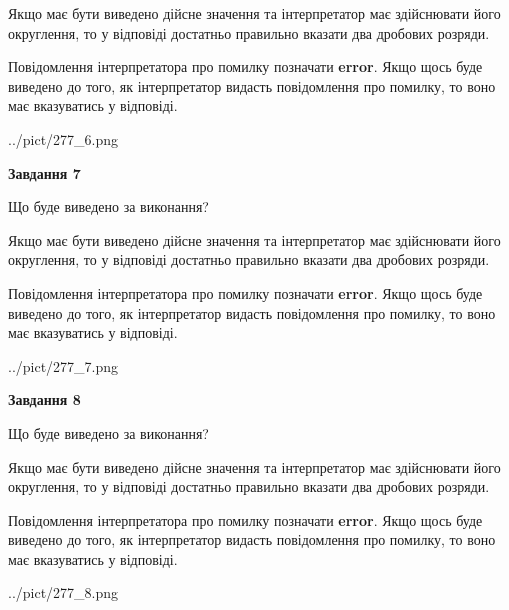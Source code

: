 \documentclass[12pt, ukrainian]{article}
\begin{document}
{\begin {Large}
Якщо має бути виведено дійсне значення та інтерпретатор має здійснювати його округлення, 
то у відповіді достатньо правильно вказати два дробових розряди.

Повідомлення інтерпретатора про помилку позначати \textbf{error}.
Якщо щось буде виведено до того, як інтерпретатор видасть повідомлення про помилку, 
то воно має вказуватись у відповіді. \par

\begin{center}
	{../pict/277_6.png}
\end{center}
\newpage

{\begin {center}\textbf{Завдання 7}\end {center}}\par
Що буде виведено за виконання? \par

Якщо має бути виведено дійсне значення та інтерпретатор має здійснювати його округлення, 
то у відповіді достатньо правильно вказати два дробових розряди.

Повідомлення інтерпретатора про помилку позначати \textbf{error}.
Якщо щось буде виведено до того, як інтерпретатор видасть повідомлення про помилку, 
то воно має вказуватись у відповіді. \par

\begin{center}
	{../pict/277_7.png}
\end{center}
\newpage

{\begin {center}\textbf{Завдання 8}\end {center}}\par
Що буде виведено за виконання? \par

Якщо має бути виведено дійсне значення та інтерпретатор має здійснювати його округлення, 
то у відповіді достатньо правильно вказати два дробових розряди.

Повідомлення інтерпретатора про помилку позначати \textbf{error}.
Якщо щось буде виведено до того, як інтерпретатор видасть повідомлення про помилку, 
то воно має вказуватись у відповіді. \par

\begin{center}
	{../pict/277_8.png}
\end{center}
\newpage


\end{Large}}
\end{document}
